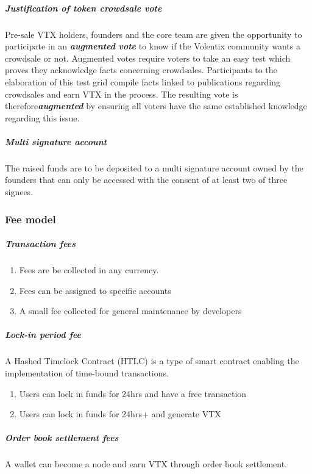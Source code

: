 \documentclass[]{article}
\begin{document}
\subparagraph{Justification of token crowdsale vote}
Pre-sale VTX holders, founders and the core team are given the opportunity to participate in an \textbf{\textit{augmented} \textit{vote}}\cite{21} 
to know if the Volentix community wants a crowdsale or not. 
Augmented votes require voters to take an easy test which proves they acknowledge facts concerning crowdsales. 
Participants to the elaboration of this test grid compile facts linked to publications regarding crowdsales and earn VTX in the process. 
The resulting vote is therefore\textit{\textbf{augmented}} by ensuring all voters have the same established knowledge regarding this issue.  

\subparagraph{Multi signature account}
The raised funds are to be deposited to a multi signature account owned by the founders 
that can only be accessed with the consent of at least two of three signees.

\subsubsection{Fee model}
\subparagraph{Transaction fees\\}
\begin{enumerate}
	\item Fees are be collected in any currency.\\
	\item Fees can be assigned to specific accounts\\
	\item A small fee collected for general maintenance by developers\\
\end{enumerate}
\subparagraph{Lock-in period fee\\}
	A Hashed Timelock Contract (HTLC)\cite{22} is a type of smart contract enabling the implementation of time-bound transactions.
\begin{enumerate}
	\item Users can lock in funds for 24hrs and have a free transaction\\
	\item Users can lock in funds for 24hrs+ and generate VTX \\
\end{enumerate}
\subparagraph{Order book settlement fees}
A wallet can become a node and earn VTX through order book settlement. 
\end{document}
